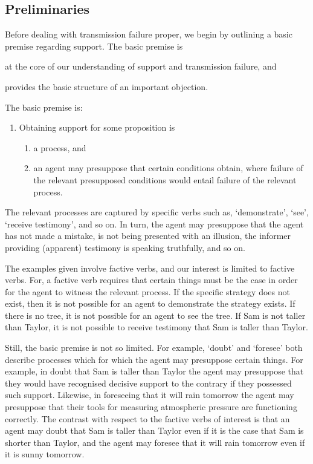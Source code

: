 \documentclass[10pt]{article}
\begin{document}
\subsection{Preliminaries}
\label{sec:preliminaries}

\begin{note}
  Before dealing with transmission failure proper, we begin by outlining a basic premise regarding support.
  The basic premise is
  \begin{enumerate*}
  \item at the core of our understanding of support and transmission failure, and
  \item provides the basic structure of an important objection.
  \end{enumerate*}

  The basic premise is:
  \begin{enumerate}[label=(A\arabic*), ref=(A\arabic*)]
  \item\label{Att:Prem:Presupp} Obtaining support for some proposition is
    \begin{enumerate}[label=(A1\alph*), ref=(A1\alph*)]
    \item\label{Att:Prem:Presupp:1} a process, and
    \item\label{Att:Prem:Presupp:2} an agent may presuppose that certain conditions obtain, where failure of the relevant presupposed conditions would entail failure of the relevant process.
    \end{enumerate}
  \end{enumerate}
  The relevant processes are captured by specific verbs such as, `demonstrate', `see', `receive testimony', and so on.
  In turn, the agent may presuppose that the agent has not made a mistake, is not being presented with an illusion, the informer providing (apparent) testimony is speaking truthfully, and so on.

  The examples given involve factive verbs, and our interest is limited to factive verbs.
  For, a factive verb requires that certain things must be the case in order for the agent to witness the relevant process.
  If the specific strategy does not exist, then it is not possible for an agent to demonstrate the strategy exists.
  If there is no tree, it is not possible for an agent to see the tree.
  If Sam is not taller than Taylor, it is not possible to receive testimony that Sam is taller than Taylor.

  Still, the basic premise is not so limited.
  For example, `doubt' and `foresee' both describe processes which for which the agent may presuppose certain things.
  For example, in doubt that Sam is taller than Taylor the agent may presuppose that they would have recognised decisive support to the contrary if they possessed such support.
  Likewise, in foreseeing that it will rain tomorrow the agent may presuppose that their tools for measuring atmospheric pressure are functioning correctly.
  The contrast with respect to the factive verbs of interest is that an agent may doubt that Sam is taller than Taylor even if it is the case that Sam is shorter than Taylor, and the agent may foresee that it will rain tomorrow even if it is sunny tomorrow.


\end{note}
\end{document}
